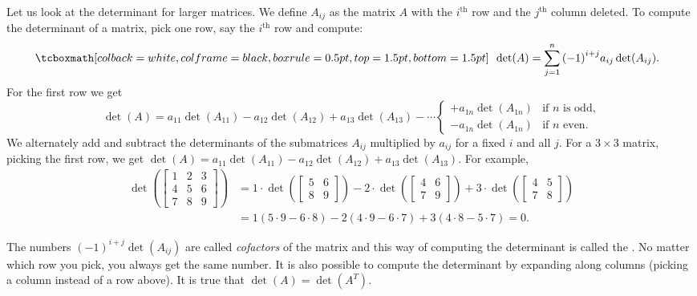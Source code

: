 \medskip

Let us look at the determinant for larger matrices.  We define $A_{ij}$ as
the matrix $A$ with the $i^{\text{th}}$ row and the $j^{\text{th}}$ column
deleted.  To compute the determinant of a matrix, pick one row, say the
$i^{\text{th}}$ row and compute:
\begin{equation*}
\mybxbg{~~
\det (A) =
\sum_{j=1}^n
{(-1)}^{i+j}
a_{ij} \det (A_{ij}) .
~~}
\end{equation*}
For the first row we get
\begin{equation*}
\det (A) =
a_{11} \det (A_{11}) - 
a_{12} \det (A_{12}) + 
a_{13} \det (A_{13}) - 
\cdots
\begin{cases}
+ a_{1n} \det (A_{1n}) & \text{if } n \text{ is odd,} \\
- a_{1n} \det (A_{1n}) & \text{if } n \text{ even.}
\end{cases}
\end{equation*}
We alternately add and subtract the determinants of the submatrices
$A_{ij}$ multiplied by $a_{ij}$ for a fixed $i$ and all $j$.
For a $3 \times 3$ matrix,
picking the first row, we get $\det (A) = a_{11} \det (A_{11}) -
a_{12} \det (A_{12}) + a_{13} \det (A_{13})$.  For example,
\begin{equation*}
\begin{split}
\det \left(
\begin{bmatrix}
1 & 2 & 3 \\
4 & 5 & 6 \\
7 & 8 & 9
\end{bmatrix}
\right)
& =
1 \cdot
\det \left(
\begin{bmatrix}
5 & 6 \\
8 & 9
\end{bmatrix}
\right)
-
2 \cdot
\det \left(
\begin{bmatrix}
4 & 6 \\
7 & 9
\end{bmatrix}
\right)
+
3 \cdot
\det \left(
\begin{bmatrix}
4 & 5 \\
7 & 8
\end{bmatrix}
\right) \\
& =
1 (5 \cdot 9 - 6 \cdot 8)
-
2 (4 \cdot 9 - 6 \cdot 7)
+
3 (4 \cdot 8 - 5 \cdot 7)
= 0 .
\end{split}
\end{equation*}

The numbers ${(-1)}^{i+j}\det(A_{ij})$ are called
\emph{cofactors}
of the matrix and
this way of computing the determinant is called the
\emph{}.
No matter which row you pick, you always get the same number.
It is also possible to compute the
determinant by expanding
along columns (picking a column instead of a row above).
It is true that $\det(A) = \det(A^T)$.

